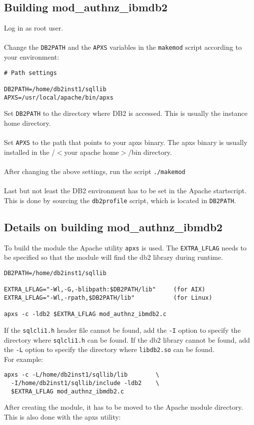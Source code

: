\documentclass[11pt,letterpaper]{article}
\begin{document}
\subsection{Building mod\_authnz\_ibmdb2}
Log in as root user.\\
\\
Change the {\tt DB2PATH} and the {\tt APXS} variables in the {\tt makemod} script according to your environment:
\begin{verbatim}
# Path settings

DB2PATH=/home/db2inst1/sqllib
APXS=/usr/local/apache/bin/apxs
\end{verbatim}
Set {\tt DB2PATH} to the directory where DB2 is accessed. This is usually the instance home directory.\\
\\
Set {\tt APXS} to the path that points to your apxs binary. The apxs binary is usually installed in the /$<$your apache home$>$/bin directory.\\
\\
After changing the above settings, run the script {\tt ./makemod}\\
\\
Last but not least the DB2 environment has to be set in the Apache startscript. This is done by sourcing the {\tt db2profile} script, which is located in {\tt DB2PATH}.
\subsection{Details on building mod\_authnz\_ibmdb2}
To build the module the Apache utility {\tt apxs} is used. The {\tt EXTRA\_LFLAG} needs to be specified so that the module will find the db2 library during runtime.
\begin{verbatim}
DB2PATH=/home/db2inst1/sqllib

EXTRA_LFLAG="-Wl,-G,-blibpath:$DB2PATH/lib"     (for AIX)
EXTRA_LFLAG="-Wl,-rpath,$DB2PATH/lib"           (for Linux)

apxs -c -ldb2 $EXTRA_LFLAG mod_authnz_ibmdb2.c
\end{verbatim}
If the {\tt sqlcli1.h} header file cannot be found, add the {\tt -I} option to specify the
directory where {\tt sqlcli1.h} can be found.
If the db2 library cannot be found, add the {\tt -L} option to specify the
directory where {\tt libdb2.so} can be found.\\

For example:
\begin{verbatim}
apxs -c -L/home/db2inst1/sqllib/lib        \
  -I/home/db2inst1/sqllib/include -ldb2    \
  $EXTRA_LFLAG mod_authnz_ibmdb2.c
\end{verbatim}
After creating the module, it has to be moved to the Apache module directory. This is also done with the apxs utility:
\end{document}
